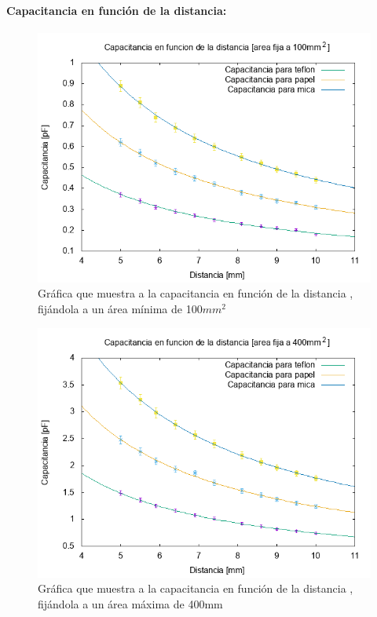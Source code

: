 \documentclass[letterpaper, 11 pt]{article}
\begin{document}
\begin{multicols}{2}
\paragraph{Capacitancia en función de la distancia:}

\begin{figure}[H]
    \includegraphics[scale=0.5]{Cd100.png}
    \caption{Gráfica que muestra a la capacitancia en función de la distancia , fijándola a un área mínima de 100$mm^2$}
    \centering
\end{figure}


\begin{figure}[H]
    \includegraphics[scale=0.5]{QUIEROSERTUYOIVONNE.png}
    \caption{Gráfica que muestra a la capacitancia en función de la distancia , fijándola a un área máxima de 400mm}
    \centering
\end{figure}


\end{multicols}
\end{document}
